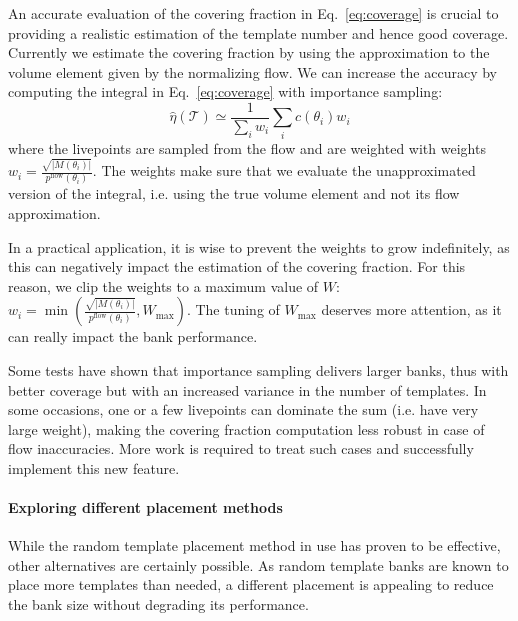 \documentclass[twocolumn,showpacs,preprintnumbers,nofootinbib,prd,
superscriptaddress,10pt]{revtex4-2}
\begin{document}
An accurate evaluation of the covering fraction in Eq.~\eqref{eq:coverage} is crucial to providing a realistic estimation of the template number and hence good coverage.
Currently we estimate the covering fraction by using the approximation to the volume element given by the normalizing flow.
We can increase the accuracy by computing the integral in  Eq.~\eqref{eq:coverage} with importance sampling:
\begin{equation}\label{eq:coverage_estimate_IS}
	\hat{\eta}(\mathcal{T}) \simeq \frac{1}{\sum_i w_i} \sum_i c(\theta_i) w_i 
\end{equation}
where the livepoints are sampled from the flow and are weighted with weights $w_i = \frac{\sqrt{|M(\theta_i)|}}{p^\text{flow}(\theta_i)}$.
The weights make sure that we evaluate the unapproximated version of the integral, i.e. using the true volume element and not its flow approximation.

In a practical application, it is wise to prevent the weights to grow indefinitely, as this can negatively impact the estimation of the covering fraction. For this reason, we clip the weights to a maximum value of $W$: ${w_i = \min\left(\frac{\sqrt{|M(\theta_i)|}}{p^\text{flow}(\theta_i)}, W_\text{max} \right)}$. The tuning of $W_\text{max}$ deserves more attention, as it can really impact the bank performance.

Some tests have shown that importance sampling delivers larger banks, thus with better coverage but with an increased variance in the number of templates. In some occasions, one or a few livepoints can dominate the sum (i.e. have very large weight), making the covering fraction computation less robust in case of flow inaccuracies.
More work is required to treat such cases and successfully implement this new feature.


\paragraph{Exploring different placement methods}

While the random template placement method in use has proven to be effective, other alternatives are certainly possible. As random template banks are known to place more templates than needed, a different placement is appealing to reduce the bank size without degrading its performance.
\end{document}
